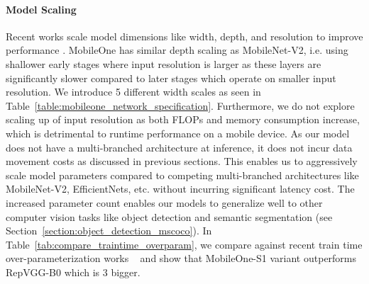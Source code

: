 \paragraph{Model Scaling} 
Recent works scale model dimensions like width, depth, and resolution to improve performance \cite{efficientnet_v1_plmr,tinynet_neurips}. MobileOne has similar depth scaling as MobileNet-V2, i.e. using shallower early stages where input resolution is larger as these layers are significantly slower compared to later stages which operate on smaller input resolution. We introduce 5 different width scales as seen in Table~\ref{table:mobileone_network_specification}. Furthermore, we do not explore scaling up of input resolution as both FLOPs and memory consumption increase, which is detrimental to runtime performance on a mobile device. As our model does not have a multi-branched architecture at inference, it does not incur data movement costs as discussed in previous sections. This enables us to aggressively scale model parameters compared to competing multi-branched architectures like MobileNet-V2, EfficientNets, etc. without incurring significant latency cost. The increased parameter count enables our models to generalize well to other computer vision tasks like object detection and semantic segmentation (see Section~\ref{section:object_detection_mscoco}). In Table~\ref{tab:compare_traintime_overparam}, we compare against recent train time over-parameterization works ~\cite{Ding_2021_repvgg,ding2021diverse,Ding_2019_ICCV,NEURIPS2020_expandnets} and show that MobileOne-S1 variant outperforms RepVGG-B0 which is 3 bigger.


